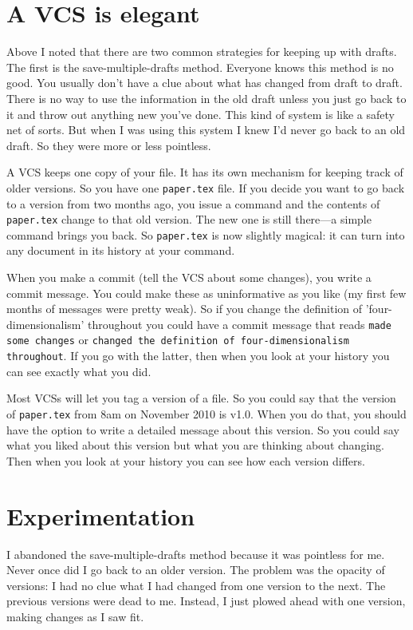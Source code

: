 \documentclass{article}
\begin{document}
\section{A VCS is elegant}

Above I noted that there are two common strategies for keeping up with 
drafts. The first is the save-multiple-drafts method. Everyone knows 
this method is no good. You usually don't have a clue about what has 
changed from draft to draft. There is no way to use the information in 
the old draft unless you just go back to it and throw out anything new 
you've done. This kind of system is like a safety net of sorts. But 
when I was using this system I knew I'd never go back to an old draft. 
So they were more or less pointless.

A VCS keeps one copy of your file. It has its own mechanism for 
keeping track of older versions. So you have one \lstinline!paper.tex!  
file. If you decide you want to go back to a version from two months 
ago, you issue a command and the contents of \lstinline!paper.tex! change 
to that old version. The new one is still there—a simple command 
brings you back. So \lstinline!paper.tex! is now slightly magical: it can 
turn into any document in its history at your command.

When you make a commit (tell the VCS about some changes), you write a 
commit message. You could make these as uninformative as you like (my 
first few months of messages were pretty weak). So if you change the 
definition of 'four-dimensionalism' throughout you could have a commit 
message that reads \lstinline!made some changes! or 
\lstinline!changed the definition of four-dimensionalism throughout!. 
If you go with the 
latter, then when you look at your history you can see exactly what 
you did.

Most VCSs will let you tag a version of a file. So you could say that 
the version of \lstinline!paper.tex! from 8am on November 2010 is v1.0. 
When you do that, you should have the option to write a detailed 
message about this version. So you could say what you liked about this 
version but what you are thinking about changing.  Then when you look 
at your history you can see how each version differs.

\section{Experimentation}

I abandoned the save-multiple-drafts method because it was pointless 
for me. Never once did I go back to an older version. The problem was 
the opacity of versions: I had no clue what I had changed from one 
version to the next. The previous versions were dead to me. Instead, I 
just plowed ahead with one version, making changes as I saw fit.
\end{document}

